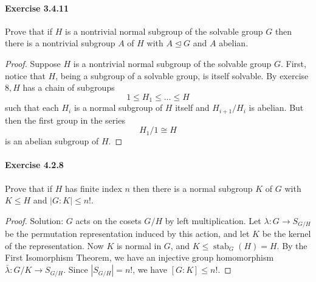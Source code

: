 \documentclass{article}
\theoremstyle{definition}
\begin{document}
\paragraph{Exercise 3.4.11} Prove that if $H$ is a nontrivial normal subgroup of the solvable group $G$ then there is a nontrivial subgroup $A$ of $H$ with $A \unlhd G$ and $A$ abelian.
\begin{proof}
    Suppose $H$ is a nontrivial normal subgroup of the solvable group $G$.
First, notice that $H$, being a subgroup of a solvable group, is itself solvable. By exercise $8, H$ has a chain of subgroups
$$
1 \leq H_1 \leq \ldots \leq H
$$
such that each $H_i$ is a normal subgroup of $H$ itself and $H_{i+1} / H_i$ is abelian. But then the first group in the series
$$
H_1 / 1 \cong H
$$
is an abelian subgroup of $H$.
\end{proof}



\paragraph{Exercise 4.2.8} Prove that if $H$ has finite index $n$ then there is a normal subgroup $K$ of $G$ with $K \leq H$ and $|G: K| \leq n!$.
\begin{proof}
    Solution: $G$ acts on the cosets $G / H$ by left multiplication. Let $\lambda: G \rightarrow S_{G / H}$ be the permutation representation induced by this action, and let $K$ be the kernel of the representation.
Now $K$ is normal in $G$, and $K \leq \operatorname{stab}_G(H)=H$. By the First Isomorphism Theorem, we have an injective group homomorphism $\bar{\lambda}: G / K \rightarrow S_{G / H}$. Since $\left|S_{G / H}\right|=n !$, we have $[G: K] \leq n !$.
\end{proof}
\end{document}
